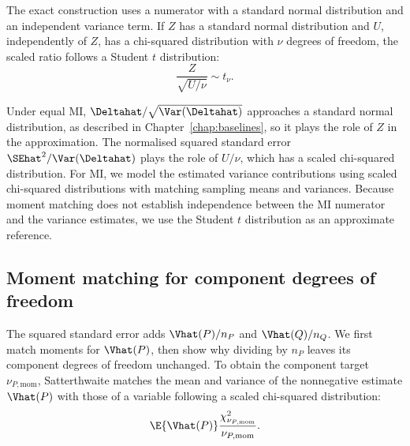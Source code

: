 \begin{samepage}
\medskip
The exact construction uses a numerator with a standard normal
distribution and an independent variance term. If \(Z\) has a standard normal distribution
and \(U\), independently of \(Z\), has a chi-squared distribution with \(\nu\)
degrees of freedom, the scaled ratio follows a Student \(t\) distribution:
\begin{equation}
 \frac{Z}{\sqrt{U/\nu}}\sim t_\nu.
 \label{eq:t-reference-construction}
\end{equation}
\par
\end{samepage}
Under equal MI, \(\Deltahat/\sqrt{\Var(\Deltahat)}\) approaches a standard
normal distribution, as described in Chapter~\ref{chap:baselines}, so it
plays the role of \(Z\) in the approximation. The normalised
squared standard error \(\SEhat^2/\Var(\Deltahat)\) plays the role of
\(U/\nu\), which has a scaled chi-squared distribution. For MI, we model
the estimated variance contributions using scaled chi-squared
distributions with matching sampling means and variances. Because moment
matching does not establish independence between the MI numerator and
the variance estimates, we use the Student \(t\) distribution as an
approximate reference.

\subsection{Moment matching for component degrees of freedom}

The squared standard error adds \(\Vhat(P)/n_P\) and \(\Vhat(Q)/n_Q\).
We first match moments for \(\Vhat(P)\), then show why dividing by
\(n_P\) leaves its component degrees of freedom unchanged.
To obtain the component target \(\nu_{P,\mathrm{mom}}\), Satterthwaite
matches the mean and variance of the nonnegative estimate \(\Vhat(P)\)
with those of a variable following a scaled chi-squared distribution:
\begin{equation}
  \E\{\Vhat(P)\}
  \frac{\chi^2_{\nu_{P,\mathrm{mom}}}}{\nu_{P,\mathrm{mom}}}.
  \label{eq:scaled-chi-working}
\end{equation}


